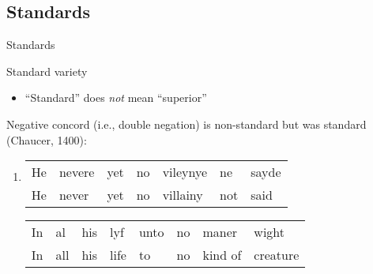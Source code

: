 \documentclass{beamer}
\newcommand{\subtwosix}{Standards}
\begin{document}
    \subsection{\subtwosix}
      \begin{frame}{\subtwosix}
        \begin{alertblock}{Standard variety}
          
          \begin{itemize}
            \item ``Standard'' does \emph{not} mean ``superior''
          \end{itemize}
        \end{alertblock}
        \begin{example}
          Negative concord (i.e., double negation) is non-standard but was standard (Chaucer, 1400):
          \begin{enumerate}
            \item
            \parbox[t]{\linewidth}{
              \begin{tabular}{l l l l l l l}
                He & nevere & yet & no & vileynye & ne  & sayde \\
                He & never  & yet & no & villainy & not & said
              \end{tabular}
              \begin{tabular}{l l l l l l l l}
                In & al  & his & lyf  & unto & no & maner   & wight \\
                In & all & his & life & to   & no & kind of & creature
              \end{tabular}
            }
          \end{enumerate}
        \end{example}
      \end{frame}
\end{document}
